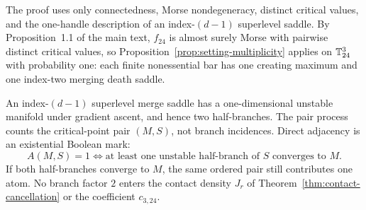 The proof uses only connectedness, Morse nondegeneracy, distinct critical values, and the one-handle description of an index-$(d-1)$ superlevel saddle. By Proposition~1.1 of the main text, $f_{24}$ is almost surely Morse with pairwise distinct critical values, so Proposition~\ref{prop:setting-multiplicity} applies on $\mathbb T^3_{24}$ with probability one: each finite nonessential bar has one creating maximum and one index-two merging death saddle.

\begin{remark}\label{rem:setting-branch}
An index-$(d-1)$ superlevel merge saddle has a one-dimensional unstable manifold under gradient ascent, and hence two half-branches. The pair process counts the critical-point pair $(M,S)$, not branch incidences. Direct adjacency is an existential Boolean mark:
\begin{equation}\label{eq:setting-adjacency}
A(M,S)=1\iff\text{at least one unstable half-branch of }S\text{ converges to }M .
\end{equation}
If both half-branches converge to $M$, the same ordered pair still contributes one atom. No branch factor $2$ enters the contact density $J_r$ of Theorem~\ref{thm:contact-cancellation} or the coefficient $c_{3,24}$.
\end{remark}
